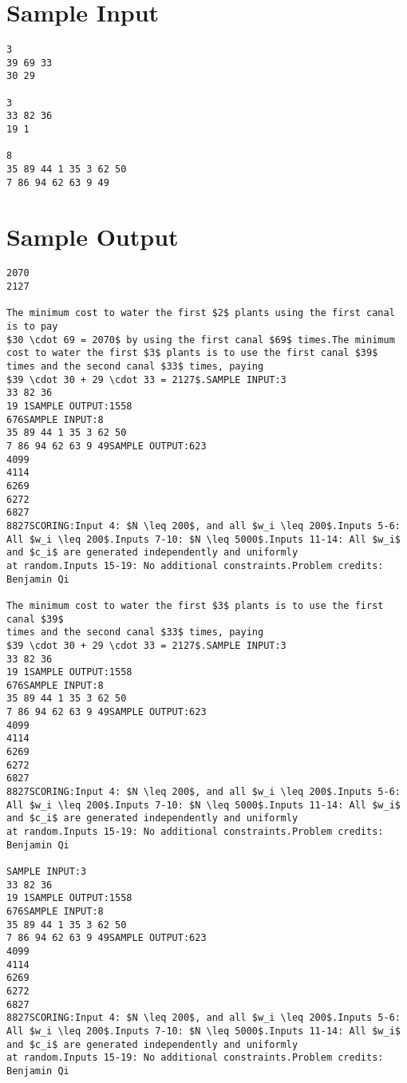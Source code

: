 \documentclass[12pt]{article}
\begin{document}
\section*{Sample Input}
\begin{verbatim}
3
39 69 33
30 29

3
33 82 36
19 1

8
35 89 44 1 35 3 62 50
7 86 94 62 63 9 49
\end{verbatim}

\section*{Sample Output}
\begin{verbatim}
2070
2127

The minimum cost to water the first $2$ plants using the first canal is to pay
$30 \cdot 69 = 2070$ by using the first canal $69$ times.The minimum cost to water the first $3$ plants is to use the first canal $39$
times and the second canal $33$ times, paying
$39 \cdot 30 + 29 \cdot 33 = 2127$.SAMPLE INPUT:3
33 82 36
19 1SAMPLE OUTPUT:1558
676SAMPLE INPUT:8
35 89 44 1 35 3 62 50
7 86 94 62 63 9 49SAMPLE OUTPUT:623
4099
4114
6269
6272
6827
8827SCORING:Input 4: $N \leq 200$, and all $w_i \leq 200$.Inputs 5-6: All $w_i \leq 200$.Inputs 7-10: $N \leq 5000$.Inputs 11-14: All $w_i$ and $c_i$ are generated independently and uniformly
at random.Inputs 15-19: No additional constraints.Problem credits: Benjamin Qi

The minimum cost to water the first $3$ plants is to use the first canal $39$
times and the second canal $33$ times, paying
$39 \cdot 30 + 29 \cdot 33 = 2127$.SAMPLE INPUT:3
33 82 36
19 1SAMPLE OUTPUT:1558
676SAMPLE INPUT:8
35 89 44 1 35 3 62 50
7 86 94 62 63 9 49SAMPLE OUTPUT:623
4099
4114
6269
6272
6827
8827SCORING:Input 4: $N \leq 200$, and all $w_i \leq 200$.Inputs 5-6: All $w_i \leq 200$.Inputs 7-10: $N \leq 5000$.Inputs 11-14: All $w_i$ and $c_i$ are generated independently and uniformly
at random.Inputs 15-19: No additional constraints.Problem credits: Benjamin Qi

SAMPLE INPUT:3
33 82 36
19 1SAMPLE OUTPUT:1558
676SAMPLE INPUT:8
35 89 44 1 35 3 62 50
7 86 94 62 63 9 49SAMPLE OUTPUT:623
4099
4114
6269
6272
6827
8827SCORING:Input 4: $N \leq 200$, and all $w_i \leq 200$.Inputs 5-6: All $w_i \leq 200$.Inputs 7-10: $N \leq 5000$.Inputs 11-14: All $w_i$ and $c_i$ are generated independently and uniformly
at random.Inputs 15-19: No additional constraints.Problem credits: Benjamin Qi


\end{verbatim}
\end{document}
